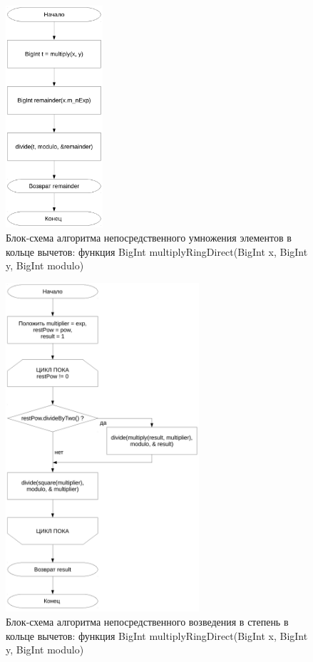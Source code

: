 \documentclass[a4paper,12pt]{article} %
\begin{document}
\begin{figure}[ht]
	\centering
	\includegraphics[width=0.32\textwidth]{lr5_multiplyRingDirect.pdf}
	\caption{
		Блок-схема алгоритма непосредственного умножения элементов в кольце вычетов:
		функция BigInt multiplyRingDirect(BigInt x, BigInt y, BigInt modulo)
	}
	\label{bs_multiply_direct}
\end{figure}

\begin{figure}[ht]
	\centering
	\includegraphics[width=0.64\textwidth]{lr5_raiseToPowerRingDirect.pdf}
	\caption{
		Блок-схема алгоритма непосредственного возведения в степень в кольце вычетов:
		функция BigInt multiplyRingDirect(BigInt x, BigInt y, BigInt modulo)
	}
	\label{bs_power_direct}
\end{figure}
\end{document}
